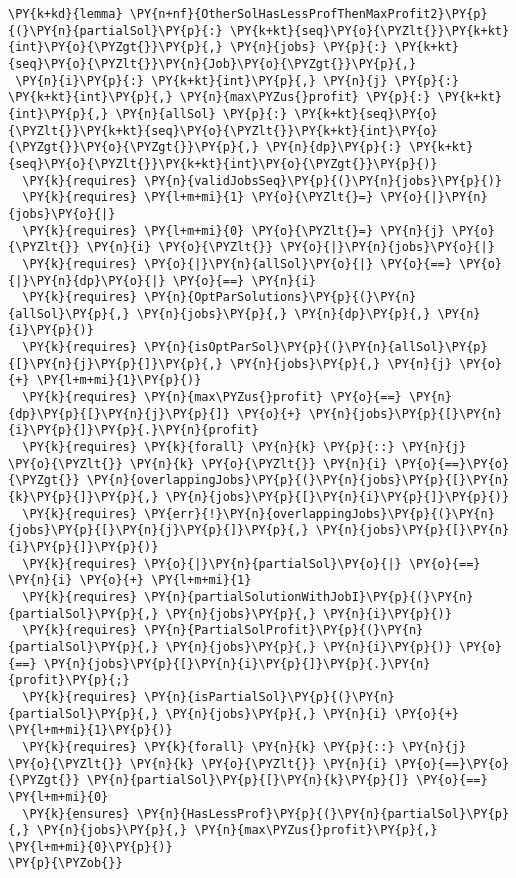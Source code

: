 \begin{Verbatim}[commandchars=\\\{\},fontsize=\small]
\PY{k+kd}{lemma} \PY{n+nf}{OtherSolHasLessProfThenMaxProfit2}\PY{p}{(}\PY{n}{partialSol}\PY{p}{:} \PY{k+kt}{seq}\PY{o}{\PYZlt{}}\PY{k+kt}{int}\PY{o}{\PYZgt{}}\PY{p}{,} \PY{n}{jobs} \PY{p}{:} \PY{k+kt}{seq}\PY{o}{\PYZlt{}}\PY{n}{Job}\PY{o}{\PYZgt{}}\PY{p}{,}
 \PY{n}{i}\PY{p}{:} \PY{k+kt}{int}\PY{p}{,} \PY{n}{j} \PY{p}{:} \PY{k+kt}{int}\PY{p}{,} \PY{n}{max\PYZus{}profit} \PY{p}{:} \PY{k+kt}{int}\PY{p}{,} \PY{n}{allSol} \PY{p}{:} \PY{k+kt}{seq}\PY{o}{\PYZlt{}}\PY{k+kt}{seq}\PY{o}{\PYZlt{}}\PY{k+kt}{int}\PY{o}{\PYZgt{}}\PY{o}{\PYZgt{}}\PY{p}{,} \PY{n}{dp}\PY{p}{:} \PY{k+kt}{seq}\PY{o}{\PYZlt{}}\PY{k+kt}{int}\PY{o}{\PYZgt{}}\PY{p}{)}
  \PY{k}{requires} \PY{n}{validJobsSeq}\PY{p}{(}\PY{n}{jobs}\PY{p}{)}
  \PY{k}{requires} \PY{l+m+mi}{1} \PY{o}{\PYZlt{}=} \PY{o}{|}\PY{n}{jobs}\PY{o}{|}
  \PY{k}{requires} \PY{l+m+mi}{0} \PY{o}{\PYZlt{}=} \PY{n}{j} \PY{o}{\PYZlt{}} \PY{n}{i} \PY{o}{\PYZlt{}} \PY{o}{|}\PY{n}{jobs}\PY{o}{|}
  \PY{k}{requires} \PY{o}{|}\PY{n}{allSol}\PY{o}{|} \PY{o}{==} \PY{o}{|}\PY{n}{dp}\PY{o}{|} \PY{o}{==} \PY{n}{i} 
  \PY{k}{requires} \PY{n}{OptParSolutions}\PY{p}{(}\PY{n}{allSol}\PY{p}{,} \PY{n}{jobs}\PY{p}{,} \PY{n}{dp}\PY{p}{,} \PY{n}{i}\PY{p}{)}
  \PY{k}{requires} \PY{n}{isOptParSol}\PY{p}{(}\PY{n}{allSol}\PY{p}{[}\PY{n}{j}\PY{p}{]}\PY{p}{,} \PY{n}{jobs}\PY{p}{,} \PY{n}{j} \PY{o}{+} \PY{l+m+mi}{1}\PY{p}{)}
  \PY{k}{requires} \PY{n}{max\PYZus{}profit} \PY{o}{==} \PY{n}{dp}\PY{p}{[}\PY{n}{j}\PY{p}{]} \PY{o}{+} \PY{n}{jobs}\PY{p}{[}\PY{n}{i}\PY{p}{]}\PY{p}{.}\PY{n}{profit} 
  \PY{k}{requires} \PY{k}{forall} \PY{n}{k} \PY{p}{::} \PY{n}{j} \PY{o}{\PYZlt{}} \PY{n}{k} \PY{o}{\PYZlt{}} \PY{n}{i} \PY{o}{==}\PY{o}{\PYZgt{}} \PY{n}{overlappingJobs}\PY{p}{(}\PY{n}{jobs}\PY{p}{[}\PY{n}{k}\PY{p}{]}\PY{p}{,} \PY{n}{jobs}\PY{p}{[}\PY{n}{i}\PY{p}{]}\PY{p}{)}
  \PY{k}{requires} \PY{err}{!}\PY{n}{overlappingJobs}\PY{p}{(}\PY{n}{jobs}\PY{p}{[}\PY{n}{j}\PY{p}{]}\PY{p}{,} \PY{n}{jobs}\PY{p}{[}\PY{n}{i}\PY{p}{]}\PY{p}{)}
  \PY{k}{requires} \PY{o}{|}\PY{n}{partialSol}\PY{o}{|} \PY{o}{==} \PY{n}{i} \PY{o}{+} \PY{l+m+mi}{1}
  \PY{k}{requires} \PY{n}{partialSolutionWithJobI}\PY{p}{(}\PY{n}{partialSol}\PY{p}{,} \PY{n}{jobs}\PY{p}{,} \PY{n}{i}\PY{p}{)}
  \PY{k}{requires} \PY{n}{PartialSolProfit}\PY{p}{(}\PY{n}{partialSol}\PY{p}{,} \PY{n}{jobs}\PY{p}{,} \PY{n}{i}\PY{p}{)} \PY{o}{==} \PY{n}{jobs}\PY{p}{[}\PY{n}{i}\PY{p}{]}\PY{p}{.}\PY{n}{profit}\PY{p}{;}
  \PY{k}{requires} \PY{n}{isPartialSol}\PY{p}{(}\PY{n}{partialSol}\PY{p}{,} \PY{n}{jobs}\PY{p}{,} \PY{n}{i} \PY{o}{+} \PY{l+m+mi}{1}\PY{p}{)}
  \PY{k}{requires} \PY{k}{forall} \PY{n}{k} \PY{p}{::} \PY{n}{j} \PY{o}{\PYZlt{}} \PY{n}{k} \PY{o}{\PYZlt{}} \PY{n}{i} \PY{o}{==}\PY{o}{\PYZgt{}} \PY{n}{partialSol}\PY{p}{[}\PY{n}{k}\PY{p}{]} \PY{o}{==} \PY{l+m+mi}{0}
  \PY{k}{ensures} \PY{n}{HasLessProf}\PY{p}{(}\PY{n}{partialSol}\PY{p}{,} \PY{n}{jobs}\PY{p}{,} \PY{n}{max\PYZus{}profit}\PY{p}{,} \PY{l+m+mi}{0}\PY{p}{)}
\PY{p}{\PYZob{}}


\end{Verbatim}
